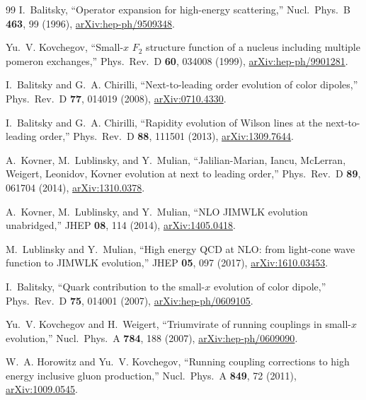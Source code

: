 \begin{thebibliography}{99}
I.~Balitsky, ``Operator expansion for high-energy scattering,'' Nucl.\ Phys.\ B \textbf{463}, 99 (1996), \href{https://arxiv.org/abs/hep-ph/9509348}{arXiv:hep-ph/9509348}.

Yu.~V. Kovchegov, ``Small-$x$ $F_2$ structure function of a nucleus including multiple pomeron exchanges,'' Phys.\ Rev.\ D \textbf{60}, 034008 (1999), \href{https://arxiv.org/abs/hep-ph/9901281}{arXiv:hep-ph/9901281}.

I.~Balitsky and G.~A. Chirilli, ``Next-to-leading order evolution of color dipoles,'' Phys.\ Rev.\ D \textbf{77}, 014019 (2008), \href{https://arxiv.org/abs/0710.4330}{arXiv:0710.4330}.

I.~Balitsky and G.~A. Chirilli, ``Rapidity evolution of Wilson lines at the next-to-leading order,'' Phys.\ Rev.\ D \textbf{88}, 111501 (2013), \href{https://arxiv.org/abs/1309.7644}{arXiv:1309.7644}.

A.~Kovner, M.~Lublinsky, and Y.~Mulian, ``Jalilian-Marian, Iancu, McLerran, Weigert, Leonidov, Kovner evolution at next to leading order,'' Phys.\ Rev.\ D \textbf{89}, 061704 (2014), \href{https://arxiv.org/abs/1310.0378}{arXiv:1310.0378}.

A.~Kovner, M.~Lublinsky, and Y.~Mulian, ``NLO JIMWLK evolution unabridged,'' JHEP \textbf{08}, 114 (2014), \href{https://arxiv.org/abs/1405.0418}{arXiv:1405.0418}.

M.~Lublinsky and Y.~Mulian, ``High energy QCD at NLO: from light-cone wave function to JIMWLK evolution,'' JHEP \textbf{05}, 097 (2017), \href{https://arxiv.org/abs/1610.03453}{arXiv:1610.03453}.

I.~Balitsky, ``Quark contribution to the small-$x$ evolution of color dipole,'' Phys.\ Rev.\ D \textbf{75}, 014001 (2007), \href{https://arxiv.org/abs/hep-ph/0609105}{arXiv:hep-ph/0609105}.

Yu.~V. Kovchegov and H.~Weigert, ``Triumvirate of running couplings in small-$x$ evolution,'' Nucl.\ Phys.\ A \textbf{784}, 188 (2007), \href{https://arxiv.org/abs/hep-ph/0609090}{arXiv:hep-ph/0609090}.

W.~A. Horowitz and Yu.~V. Kovchegov, ``Running coupling corrections to high energy inclusive gluon production,'' Nucl.\ Phys.\ A \textbf{849}, 72 (2011), \href{https://arxiv.org/abs/1009.0545}{arXiv:1009.0545}.


\end{thebibliography}
